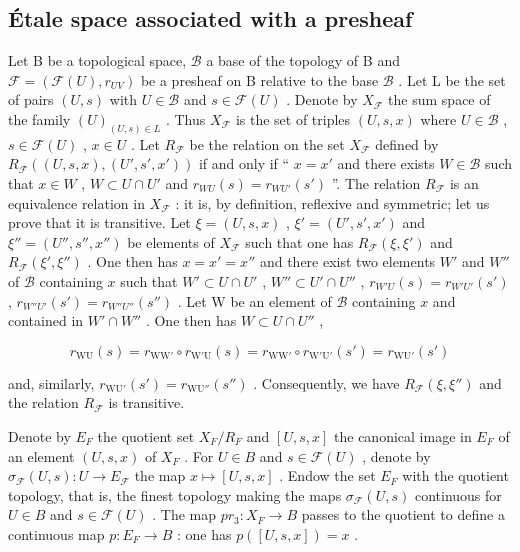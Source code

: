 \subsection{Étale space associated with a presheaf}

Let B be a topological space, \(\mathcal{B}\) a base of the topology of B and \(\mathcal{F} = (\mathcal{F}(U), r_{UV})\) be a presheaf on B relative to the base \(\mathcal{B}\) . Let L be the set of pairs \((U, s)\) with \(U \in \mathcal{B}\) and \(s \in \mathcal{F}(U)\) . Denote by \(X_{\mathcal{F}}\) the sum space of the family \((U)_{(U,s) \in L}\) . Thus \(X_{\mathcal{F}}\) is the set of triples \((U, s, x)\) where \(U \in \mathcal{B}\) , \(s \in \mathcal{F}(U)\) , \(x \in U\) . Let \(R_{\mathcal{F}}\) be the relation on the set \(X_{\mathcal{F}}\) defined by \(R_{\mathcal{F}}((U,s,x),(U',s',x'))\) if and only if “ \(x = x'\) and there exists \(W \in \mathcal{B}\) such that \(x \in W\) , \(W \subset U \cap U'\) and \(r_{WU}(s) = r_{WU'}(s')\) ”. The relation \(R_{\mathcal{F}}\) is an equivalence relation in \(X_{\mathcal{F}}\) : it is, by definition, reflexive and symmetric; let us prove that it is transitive. Let \(\xi = (U, s, x)\) , \(\xi' = (U', s', x')\) and \(\xi'' = (U'', s'', x'')\) be elements of \(X_{\mathcal{F}}\) such that one has \(R_{\mathcal{F}}(\xi,\xi')\) and \(R_{\mathcal{F}}(\xi',\xi'')\) . One then has \(x = x' = x''\) and there exist two elements \(W'\) and \(W''\) of \(\mathcal{B}\) containing \(x\) such that \(W' \subset U \cap U'\) , \(W'' \subset U' \cap U''\) , \(r_{W'U}(s) = r_{W'U'}(s')\) , \(r_{W''U'}(s') = r_{W''U''}(s'')\) . Let W be an element of \(\mathcal{B}\) containing \(x\) and contained in \(W' \cap W''\) . One then has \(W \subset U \cap U''\) ,

\[
r_{\mathrm{WU}}(s) = r_{\mathrm{WW'}} \circ r_{\mathrm{W'U}}(s) = r_{\mathrm{WW'}} \circ r_{\mathrm{W'U'}}(s') = r_{\mathrm{WU'}}(s')
\]

and, similarly, \(r_{\mathrm{WU}'}(s') = r_{\mathrm{WU}''}(s'')\) . Consequently, we have \(R_{\mathcal{F}}(\xi,\xi'')\) and the relation \(R_{\mathcal{F}}\) is transitive.

Denote by \(E_{F}\) the quotient set \(X_{F}/R_{F}\) and \([U,s,x]\) the canonical image in \(E_{F}\) of an element \((U,s,x)\) of \(X_{F}\) . For \(U \in B\) and \(s \in \mathcal{F}(U)\) , denote by \(\sigma_{\mathcal{F}}(U,s)\colon U \to E_{\mathcal{F}}\) the map \(x \mapsto [U,s,x]\) . Endow the set \(E_{F}\) with the quotient topology, that is, the finest topology making the maps \(\sigma_{\mathcal{F}}(U,s)\) continuous for \(U \in B\) and \(s \in \mathcal{F}(U)\) . The map \(pr_{3}\colon X_{F} \to B\) passes to the quotient to define a continuous map \(p\colon E_{F} \to B\) : one has \(p([U,s,x]) = x\) .

